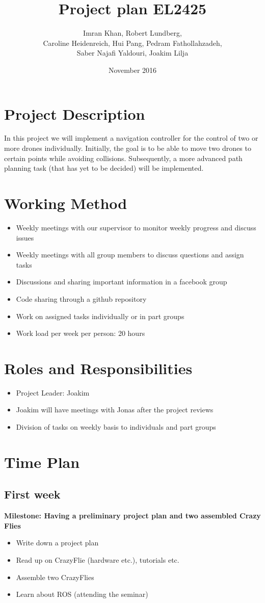 \documentclass{article}
\title{Project plan EL2425}
\author{Imran Khan, Robert Lundberg, \\ 
Caroline Heidenreich, Hui Pang, Pedram Fathollahzadeh, \\ 
Saber Najafi Yaldouri, Joakim Lilja }
\date{November 2016}
\begin{document}
\maketitle
\section{Project Description}

In this project we will implement a navigation controller for the control of two or more drones individually. Initially, the goal is to be able to move two drones to certain points while avoiding collisions. Subsequently, a more advanced path planning task (that has yet to be decided) will be implemented.

\section{Working Method}
\begin{itemize}
    \item Weekly meetings with our supervisor to monitor weekly progress and discuss issues
    \item Weekly meetings with all group members to discuss questions and assign tasks
    \item Discussions and sharing important information in a facebook group
    \item Code sharing through a github repository
    \item Work on assigned tasks individually or in part groups
    \item Work load per week per person: 20 hours
\end{itemize}
\section{Roles and Responsibilities}
\begin{itemize}
    \item Project Leader: Joakim
\item Joakim will have meetings with Jonas after the project reviews
\item Division of tasks on weekly basis to individuals and part groups
\end{itemize}

\section{Time Plan}
\subsection{First week}
\textbf{Milestone: Having a preliminary project plan and two assembled Crazy Flies}
\begin{itemize}
    \item Write down a project plan
    \item Read up on CrazyFlie (hardware etc.), tutorials etc.
    \item Assemble two CrazyFlies
    \item Learn about ROS (attending the seminar)
\end{itemize}
\end{document}
